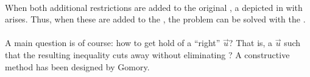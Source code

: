 \begin{example}
\paragraph{}
When both additional restrictions are added to the original , a  depicted in  with  arises. Thus, when these  are added to the , the problem can be solved with the .

\end{example}

\paragraph{}
A main question is of course: how to get hold of a ``right'' $\vec{u}$? That is, a $\vec{u}$ such that the resulting inequality cuts away  without eliminating ? A constructive method has been designed by Gomory.

